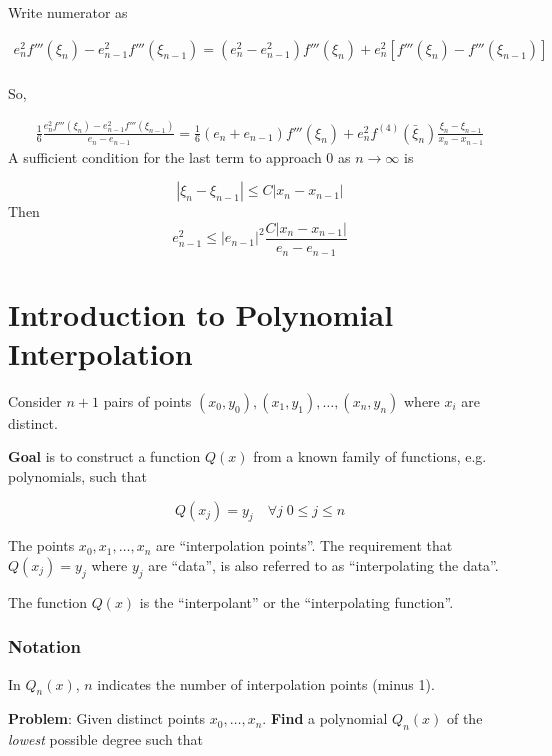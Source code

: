 Write numerator as

\begin{align}
    e_n^2f'''(\xi_{n}) - e_{n-1}^2f'''(\xi_{n-1}) = (e_n^2 - e_{n-1}^2)f'''(\xi_n) + e_n^2\left[f'''(\xi_n)- f'''(\xi_{n-1})\right] \\ 
\end{align}

So, 

\begin{align}
    \frac{1}{6} \frac{e_n^2f'''(\xi_{n}) - e_{n-1}^2f'''(\xi_{n-1})}{e_n - e_{n-1}} = \frac{1}{6}(e_n + e_{n-1})f'''(\xi_n)+e_n^2f^{(4)}(\bar \xi_n)\frac{\xi_n - \xi_{n-1}}{x_n - x_{n-1}}
\end{align}
A sufficient condition for the last term to approach 0 as $n\rightarrow \infty$ is

\[|\xi_n - \xi_{n-1}| \leq C|x_n - x_{n-1}|\]
Then
\[e_{n-1}^2 \leq |e_{n-1}|^2 \frac{C|x_n-x_{n-1}|}{e_n-e_{n-1}}\]

\section{Introduction to Polynomial Interpolation}

Consider $n+1$ pairs of points $(x_0,y_0),(x_1,y_1),\hdots,(x_n,y_n)$ where $x_i$ are distinct.

\textbf{Goal} is to construct a function $Q(x)$ from a known family of functions, e.g. polynomials, such that

\[Q(x_j)=y_j\quad \forall j\;0\leq j\leq n\]

\begin{definition} 
    The points $x_0,x_1,\hdots,x_n$ are ``interpolation points''. The requirement that $Q(x_j) = y_j$ where $y_j$ are ``data'', is also referred to as ``interpolating the data''.

    The function $Q(x)$ is the ``interpolant'' or the ``interpolating function''.
\end{definition}

\subsubsection{Notation}

In $Q_n(x)$, $n$ indicates the number of interpolation points (minus 1).

\textbf{Problem}: Given distinct points $x_0,\hdots,x_n$. \textbf{Find} a polynomial $Q_n(x)$ of the \textit{lowest} possible degree such that


